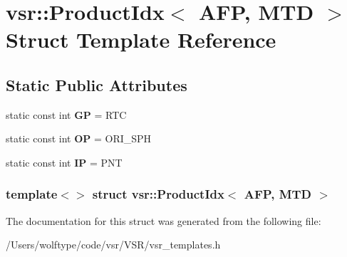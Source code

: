 \hypertarget{structvsr_1_1_product_idx_3_01_a_f_p_00_01_m_t_d_01_4}{\section{vsr\-:\-:Product\-Idx$<$ A\-F\-P, M\-T\-D $>$ Struct Template Reference}
\label{structvsr_1_1_product_idx_3_01_a_f_p_00_01_m_t_d_01_4}
}
\subsection*{Static Public Attributes}
\begin{DoxyCompactItemize}
\item 
\hypertarget{structvsr_1_1_product_idx_3_01_a_f_p_00_01_m_t_d_01_4_a12ca12dabab7244fe92a30295ce80e16}{static const int {\bfseries G\-P} = R\-T\-C}\label{structvsr_1_1_product_idx_3_01_a_f_p_00_01_m_t_d_01_4_a12ca12dabab7244fe92a30295ce80e16}

\item 
\hypertarget{structvsr_1_1_product_idx_3_01_a_f_p_00_01_m_t_d_01_4_a7b44f71a21f4b8637021439fe50c91bd}{static const int {\bfseries O\-P} = O\-R\-I\-\_\-\-S\-P\-H}\label{structvsr_1_1_product_idx_3_01_a_f_p_00_01_m_t_d_01_4_a7b44f71a21f4b8637021439fe50c91bd}

\item 
\hypertarget{structvsr_1_1_product_idx_3_01_a_f_p_00_01_m_t_d_01_4_aa795838daa179263fbdfb38ab6f05bd3}{static const int {\bfseries I\-P} = P\-N\-T}\label{structvsr_1_1_product_idx_3_01_a_f_p_00_01_m_t_d_01_4_aa795838daa179263fbdfb38ab6f05bd3}

\end{DoxyCompactItemize}
\subsubsection*{template$<$$>$ struct vsr\-::\-Product\-Idx$<$ A\-F\-P, M\-T\-D $>$}



The documentation for this struct was generated from the following file\-:\begin{DoxyCompactItemize}
\item 
/\-Users/wolftype/code/vsr/\-V\-S\-R/vsr\-\_\-templates.\-h\end{DoxyCompactItemize}
